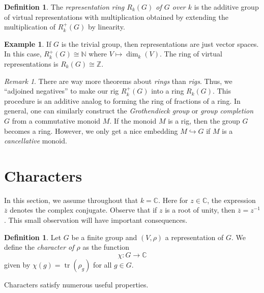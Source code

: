 \documentclass[12pt]{article}
\theoremstyle{plain}
\theoremstyle{definition}
\newtheorem{definition}[theorem]{Definition}
\newtheorem{example}[theorem]{Example}
\theoremstyle{remark}
\newtheorem{remark}[theorem]{Remark}
\numberwithin{equation}{section}
\begin{document}
\begin{definition}
The \emph{representation ring $R_k(G)$ of $G$ over $k$} is
the additive group of virtual representations with multiplication
obtained by extending the multiplication of $R^+_k(G)$ by linearity.
\end{definition}

\begin{example}
If $G$ is the trivial group, then representations are just vector spaces.
In this case, $R^+_k(G) \cong \mathbb{N}$ where $V \mapsto \dim_k(V)$.
The ring of virtual representations is $R_k(G) \cong \mathbb{Z}$.
\end{example}

\begin{remark}
There are way more theorems about \emph{rings} than \emph{rigs}.
Thus, we ``adjoined negatives'' to make our rig $R^+_k(G)$
into a ring $R_k(G)$.
This procedure is an additive analog to forming the ring of fractions of a ring.
In general, one can similarly construct the \emph{Grothendieck group}
or \emph{group completion} $G$ from a commutative monoid $M$.
If the monoid $M$ is a rig, then the group $G$ becomes a ring.
However, we only get a nice embedding $M \hookrightarrow G$ if
$M$ is a \emph{cancellative} monoid.
\end{remark}

\section{Characters}

In this section, we assume throughout that $k=\mathbb{C}$.
Here for $z \in \mathbb{C}$, the expression $\overline{z}$ denotes the
complex conjugate.  Observe that if $z$ is a root of unity, then
$\overline{z}=z^{-1}$.  This small observation will have important
consequences.

\begin{definition}
Let $G$ be a finite group and $(V,\rho)$ a representation of $G$.
We define the \emph{character of $\rho$} as the function
\[
\chi : G \to \mathbb{C}
\]
given by $\chi(g)=\operatorname{tr}(\rho_g)$ for all $g \in G$.
\end{definition}

Characters satisfy numerous useful properties.
\end{document}

